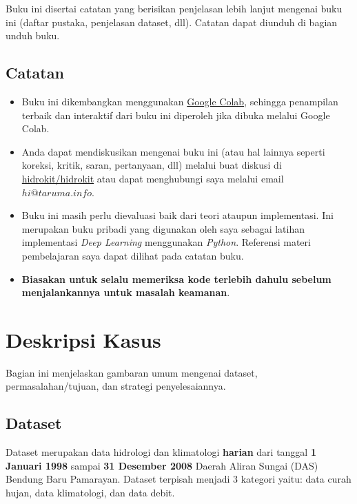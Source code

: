 \documentclass[11pt]{article}
\providecommand{\tightlist}{%
      \setlength{\itemsep}{0pt}\setlength{\parskip}{0pt}}
\begin{document}
Buku ini disertai catatan yang berisikan penjelasan lebih lanjut
mengenai buku ini (daftar pustaka, penjelasan dataset, dll). Catatan
dapat diunduh di bagian unduh buku.

\hypertarget{catatan}{%
\subsection{Catatan}\label{catatan}}

\begin{itemize}
\tightlist
\item
  Buku ini dikembangkan menggunakan
  \href{https://colab.research.google.com/}{Google Colab}, sehingga
  penampilan terbaik dan interaktif dari buku ini diperoleh jika dibuka
  melalui Google Colab.
\item
  Anda dapat mendiskusikan mengenai buku ini (atau hal lainnya seperti
  koreksi, kritik, saran, pertanyaan, dll) melalui buat diskusi di
  \href{https://github.com/hidrokit/hidrokit/discussions}{hidrokit/hidrokit}
  atau dapat menghubungi saya melalui email \(hi@taruma.info\).
\item
  Buku ini masih perlu dievaluasi baik dari teori ataupun implementasi.
  Ini merupakan buku pribadi yang digunakan oleh saya sebagai latihan
  implementasi \emph{Deep Learning} menggunakan \emph{Python}. Referensi
  materi pembelajaran saya dapat dilihat pada catatan buku.
\item
  \textbf{Biasakan untuk selalu memeriksa kode terlebih dahulu sebelum
  menjalankannya untuk masalah keamanan}.
\end{itemize}

    \hypertarget{deskripsi-kasus}{%
\section{Deskripsi Kasus}\label{deskripsi-kasus}}

Bagian ini menjelaskan gambaran umum mengenai dataset,
permasalahan/tujuan, dan strategi penyelesaiannya.

    \hypertarget{dataset}{%
\subsection{Dataset}\label{dataset}}

Dataset merupakan data hidrologi dan klimatologi \textbf{harian} dari
tanggal \textbf{1 Januari 1998} sampai \textbf{31 Desember 2008} Daerah
Aliran Sungai (DAS) Bendung Baru Pamarayan. Dataset terpisah menjadi 3
kategori yaitu: data curah hujan, data klimatologi, dan data debit.
\end{document}
